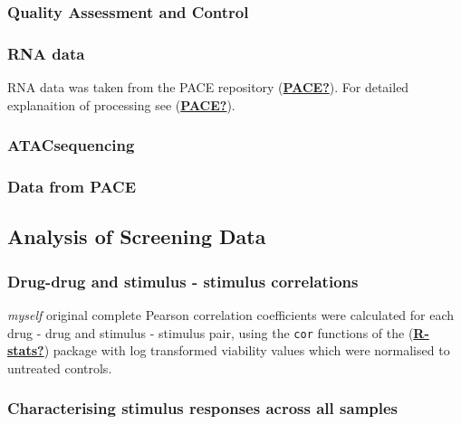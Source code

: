\documentclass[11pt, a4paper, twosided]{book}
\begin{document}
\hypertarget{quality-assessment-and-control}{%
\subsubsection{Quality Assessment and Control}\label{quality-assessment-and-control}}

\hypertarget{rna-data}{%
\subsubsection{RNA data}\label{rna-data}}

RNA data was taken from the PACE repository (\protect\hyperlink{ref-PACE}{\textbf{PACE?}}). For detailed explanaition of processing see (\protect\hyperlink{ref-PACE}{\textbf{PACE?}}).

\hypertarget{atacsequencing-1}{%
\subsubsection{ATACsequencing}\label{atacsequencing-1}}

\hypertarget{data-from-pace}{%
\subsubsection{Data from PACE}\label{data-from-pace}}

\hypertarget{analysis-of-screening-data}{%
\subsection{Analysis of Screening Data}\label{analysis-of-screening-data}}

\hypertarget{drug-drug-and-stimulus---stimulus-correlations}{%
\subsubsection{Drug-drug and stimulus - stimulus correlations}\label{drug-drug-and-stimulus---stimulus-correlations}}

\emph{myself} original complete
Pearson correlation coefficients were calculated for each drug - drug and stimulus - stimulus pair, using the \texttt{cor} functions of the (\protect\hyperlink{ref-R-stats}{\textbf{R-stats?}}) package with log transformed viability values which were normalised to untreated controls.

\hypertarget{stimulus-heatmap-method}{%
\subsubsection{Characterising stimulus responses across all samples}\label{stimulus-heatmap-method}}
\end{document}
